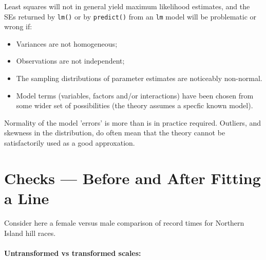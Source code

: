 Least squares will not in general yield maximum likelihood estimates,
and the SEs returned by \texttt{lm()} or by \texttt{predict()} from
an \texttt{lm} model will be problematic or wrong if:
\begin{itemize}
\item Variances are not homogeneous;
    \item Observations are not independent;
    \item The sampling distributions of parameter estimates are
      noticeably non-normal.
    \item Model terms 
    (variables, factors and/or interactions) have
      been chosen from some wider set of possibilities (the theory
      assumes a specfic known model).
 \end{itemize}

 Normality of the model 'errors' is more than is in practice required.
 Outliers, and skewness in the distribution, do often mean that the
 theory cannot be satisfactorily used as a good approxation.

\section{Checks --- Before and After Fitting a Line}

Consider here a female versus male comparison of record times for
Northern Island hill races.

\paragraph{Untransformed vs transformed scales:}

